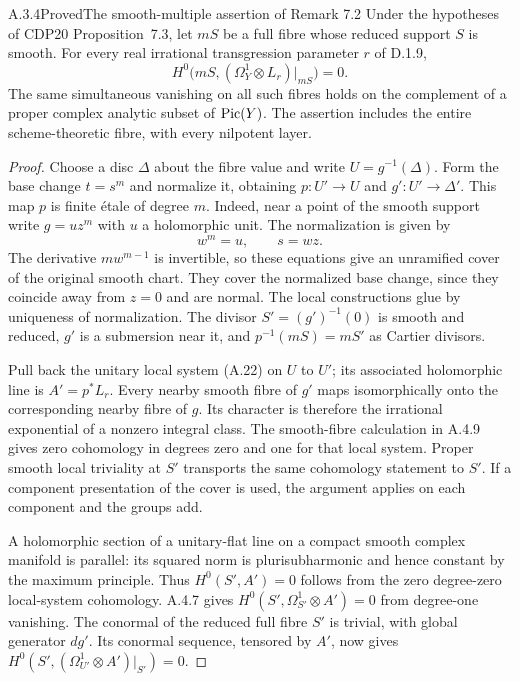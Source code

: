 \begin{statement}{A.3.4}{Proved}{The smooth-multiple assertion of Remark 7.2}
Under the hypotheses of CDP20 Proposition~7.3, let $mS$ be a full fibre whose reduced support $S$ is smooth. For every real irrational transgression parameter $r$ of D.1.9,
\[
 H^0\bigl(mS,(\Omega_Y^1\otimes L_r)|_{mS}\bigr)=0.
 \tag{A.15a}
\]
The same simultaneous vanishing on all such fibres holds on the complement of a proper complex analytic subset of $\operatorname{Pic}(Y)$. The assertion includes the entire scheme-theoretic fibre, with every nilpotent layer.
\end{statement}
\begin{proof}
Choose a disc $\Delta$ about the fibre value and write $U=g^{-1}(\Delta)$. Form the base change $t=s^m$ and normalize it, obtaining $p:U'\to U$ and $g':U'\to\Delta'$. This map $p$ is finite étale of degree $m$. Indeed, near a point of the smooth support write $g=u z^m$ with $u$ a holomorphic unit. The normalization is given by
\[
 w^m=u,\qquad s=wz.
\]
The derivative $m w^{m-1}$ is invertible, so these equations give an unramified cover of the original smooth chart. They cover the normalized base change, since they coincide away from $z=0$ and are normal. The local constructions glue by uniqueness of normalization. The divisor $S'=(g')^{-1}(0)$ is smooth and reduced, $g'$ is a submersion near it, and $p^{-1}(mS)=mS'$ as Cartier divisors.

Pull back the unitary local system (A.22) on $U$ to $U'$; its associated holomorphic line is $A'=p^*L_r$. Every nearby smooth fibre of $g'$ maps isomorphically onto the corresponding nearby fibre of $g$. Its character is therefore the irrational exponential of a nonzero integral class. The smooth-fibre calculation in A.4.9 gives zero cohomology in degrees zero and one for that local system. Proper smooth local triviality at $S'$ transports the same cohomology statement to $S'$. If a component presentation of the cover is used, the argument applies on each component and the groups add.

A holomorphic section of a unitary-flat line on a compact smooth complex manifold is parallel: its squared norm is plurisubharmonic and hence constant by the maximum principle. Thus $H^0(S',A')=0$ follows from the zero degree-zero local-system cohomology. A.4.7 gives $H^0(S',\Omega_{S'}^1\otimes A')=0$ from degree-one vanishing. The conormal of the reduced full fibre $S'$ is trivial, with global generator $dg'$. Its conormal sequence, tensored by $A'$, now gives
$H^0(S',(\Omega_{U'}^1\otimes A')|_{S'})=0$.


\end{proof}
